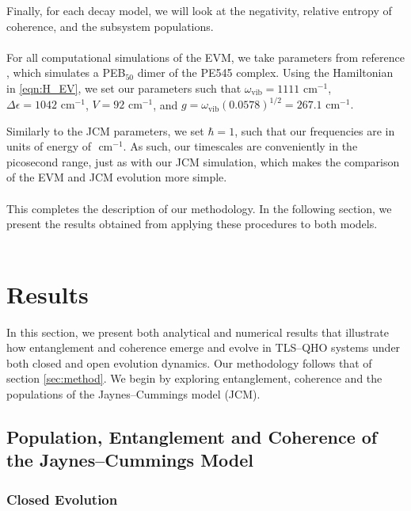\documentclass[12pt]{article}
\begin{document}
Finally, for each decay model, we will look at the negativity, relative entropy of coherence, and the subsystem populations.\\
\\
For all computational simulations of the EVM, we take parameters from reference \cite{ExVib2014-Alexandra}, which simulates a PEB$_50$ dimer of the PE545 complex. Using the Hamiltonian in \eqref{eqn:H_EV}, we set our parameters such that $\omega_{\scriptscriptstyle \text{vib}} = 1111 \text{ cm}^{-1}$, $\Delta\epsilon = 1042\text{ cm}^{-1}$, $V = 92 \text{ cm}^{-1}$, and $g = \omega_{\scriptscriptstyle \text{vib}}(0.0578)^{1/2} = 267.1 \text{ cm}^{-1}.$ 

Similarly to the JCM parameters, we set $\hbar = 1$, such that our frequencies are in units of energy of $\text{ cm}^{-1}.$ As such, our timescales are conveniently in the picosecond range, just as with our JCM simulation, which makes the comparison of the EVM and JCM evolution more simple.\\
\\
This completes the description of our methodology. In the following section, we present the results obtained from applying these procedures to both models.\\
\\
\newpage
\section{Results} \label{sec:results}

In this section, we present both analytical and numerical results that illustrate how entanglement and coherence emerge and evolve in TLS--QHO systems under both closed and open evolution dynamics. Our methodology follows that of section \ref{sec:method}. We begin by exploring entanglement, coherence and the populations of the Jaynes--Cummings model (JCM). 

\subsection{Population, Entanglement and Coherence of the Jaynes--Cummings Model}  \label{sec:results_JCM}
\subsubsection{Closed Evolution}
\end{document}
